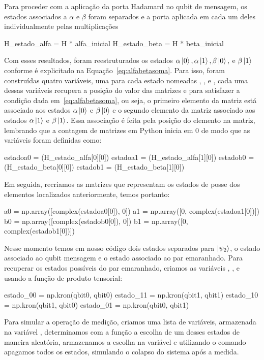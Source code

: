 Para proceder com a aplicação da porta Hadamard no qubit de mensagem, os estados associados a $\alpha$ e $\beta$ foram separados e a porta aplicada em cada um deles individualmente pelas multiplicações
\begin{pycode}
  H_estado_alfa = H * alfa_inicial
  H_estado_beta = H * beta_inicial
\end{pycode}
Com esses resultados, foram reestruturados os estados $\alpha\ket{0}, \alpha\ket{1}, \beta\ket{0},$ e $\beta\ket{1}$ conforme é explicitado na Equação~\eqref{eq:alfabetasoma}. Para isso, foram construídas quatro variáveis, uma para cada estado nomeadas , ,  e , cada uma dessas variáveis recupera a posição do valor das matrizes  e  para satisfazer a condição dada em~\eqref{eq:alfabetasoma}, ou seja, o primeiro elemento da matriz está associado aos estados $\alpha\ket{0}$ e $\beta\ket{0}$ e o segundo elemento da matriz associado aos estados $\alpha\ket{1}$ e $\beta\ket{1}$. Essa associação é feita pela posição do elemento na matriz, lembrando que a contagem de matrizes em Python inicia em 0 de modo que as variáveis foram definidas como:
\begin{pycode}
  estadoa0 = (H_estado_alfa[0][0])
  estadoa1 = (H_estado_alfa[1][0])
  estadob0 = (H_estado_beta[0][0])
  estadob1 = (H_estado_beta[1][0])
\end{pycode}
Em seguida, recriamos as matrizes que representam os estados de posse dos elementos localizados anteriormente, temos portanto:
\begin{pycode}
  a0 = np.array([complex(estadoa0[0]), 0])
  a1 = np.array([0, complex(estadoa1[0])])
  b0 = np.array([complex(estadob0[0]), 0])
  b1 = np.array([0, complex(estadob1[0])])
\end{pycode}
Nesse momento temos em nosso código dois estados separados para $\ket{\psi_2}$, o estado associado ao qubit mensagem e o estado associado ao par emaranhado. Para recuperar os estados possíveis do par emaranhado, criamos as variáveis , ,  e  usando a função de produto tensorial:
\begin{pycode}
  estado_00 = np.kron(qbit0, qbit0)
  estado_11 = np.kron(qbit1, qbit1)
  estado_10 = np.kron(qbit1, qbit0)
  estado_01 = np.kron(qbit0, qbit1)
\end{pycode}
Para simular a operação de medição, criamos uma lista de variáveis, armazenada na variável , determinamos com a função  a escolha de um desses estados de maneira aleatória, armazenamos a escolha na variável  e utilizando o comando  apagamos todos os estados, simulando o colapso do sistema após a medida.

